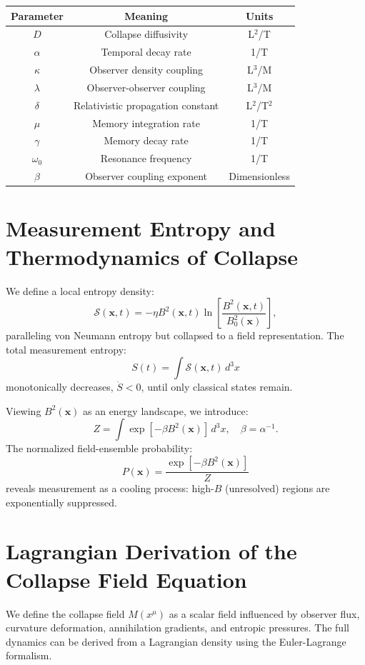 \begin{tabular}{|c|c|c|}
\hline
Parameter & Meaning & Units \\
\hline
$D$ & Collapse diffusivity & L$^2$/T \\
$\alpha$ & Temporal decay rate & 1/T \\
$\kappa$ & Observer density coupling & L$^3$/M \\
$\lambda$ & Observer-observer coupling & L$^3$/M \\
$\delta$ & Relativistic propagation constant & L$^2$/T$^2$ \\
$\mu$ & Memory integration rate & 1/T \\
$\gamma$ & Memory decay rate & 1/T \\
$\omega_0$ & Resonance frequency & 1/T \\
$\beta$ & Observer coupling exponent & Dimensionless \\
\hline
\end{tabular}

\section{Measurement Entropy and Thermodynamics of Collapse}

We define a local entropy density:
\[
\mathcal{S}(\mathbf{x},t) = -\eta B^2(\mathbf{x},t)\ln\left[\frac{B^2(\mathbf{x},t)}{B_0^2(\mathbf{x})}\right],
\]
paralleling von Neumann entropy but collapsed to a field representation. The total measurement entropy:
\[
S(t) = \int \mathcal{S}(\mathbf{x},t)\,d^3x
\]
monotonically decreases, $\dot{S} < 0$, until only classical states remain.

Viewing $B^2(\mathbf{x})$ as an energy landscape, we introduce:
\[
Z = \int \exp[-\beta B^2(\mathbf{x})]\,d^3x, \quad \beta = \alpha^{-1}.
\]
The normalized field-ensemble probability:
\[
P(\mathbf{x}) = \frac{\exp[-\beta B^2(\mathbf{x})]}{Z}
\]
reveals measurement as a cooling process: high-$B$ (unresolved) regions are exponentially suppressed.

\section{Lagrangian Derivation of the Collapse Field Equation}

We define the collapse field \( M(x^\mu) \) as a scalar field influenced by observer flux, curvature deformation, annihilation gradients, and entropic pressures. The full dynamics can be derived from a Lagrangian density using the Euler-Lagrange formalism.

